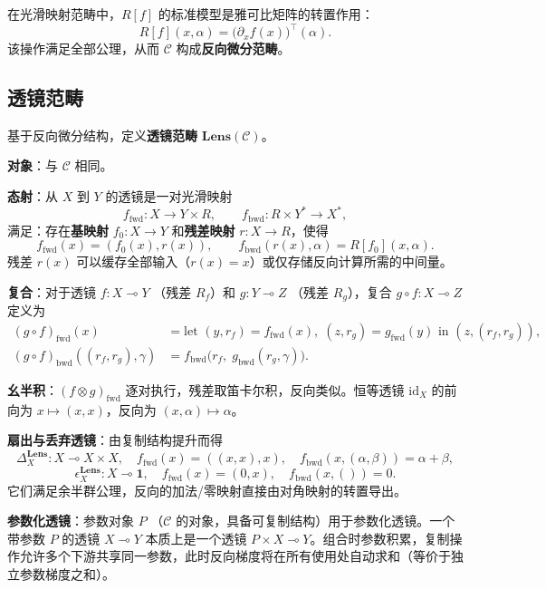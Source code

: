 \documentclass{ctexart}
\newcommand{\lensarrow}{\multimap}
\begin{document}
在光滑映射范畴中，$R[f]$ 的标准模型是雅可比矩阵的转置作用：
\[
R[f](x, \alpha) = \big( \partial_x f(x) \big)^\top (\alpha).
\]
该操作满足全部公理，从而 $\mathcal{C}$ 构成\textbf{反向微分范畴}。

\subsection{透镜范畴}

基于反向微分结构，定义\textbf{透镜范畴} $\mathbf{Lens}(\mathcal{C})$。

\textbf{对象}：与 $\mathcal{C}$ 相同。

\textbf{态射}：从 $X$ 到 $Y$ 的透镜是一对光滑映射
\[
f_{\mathrm{fwd}} : X \to Y \times R, \qquad
f_{\mathrm{bwd}} : R \times Y^* \to X^*,
\]
满足：存在\textbf{基映射} $f_0: X \to Y$ 和\textbf{残差映射} $r: X \to R$，使得
\[
f_{\mathrm{fwd}}(x) = (f_0(x), r(x)), \qquad
f_{\mathrm{bwd}}(r(x), \alpha) = R[f_0](x, \alpha).
\]
残差 $r(x)$ 可以缓存全部输入（$r(x)=x$）或仅存储反向计算所需的中间量。

\textbf{复合}：对于透镜 $f: X \lensarrow Y$ （残差 $R_f$）和 $g: Y \lensarrow Z$ （残差 $R_g$），复合 $g \circ f: X \lensarrow Z$ 定义为
\[
\begin{aligned}
(g \circ f)_{\mathrm{fwd}}(x) &= \text{let } (y, r_f) = f_{\mathrm{fwd}}(x),\; (z, r_g) = g_{\mathrm{fwd}}(y) \text{ in } (z, (r_f, r_g)),\\
(g \circ f)_{\mathrm{bwd}}((r_f, r_g), \gamma) &= f_{\mathrm{bwd}}\big(r_f,\; g_{\mathrm{bwd}}(r_g, \gamma)\big).
\end{aligned}
\]

\textbf{幺半积}：$(f \otimes g)_{\mathrm{fwd}}$ 逐对执行，残差取笛卡尔积，反向类似。恒等透镜 $\mathrm{id}_X$ 的前向为 $x \mapsto (x, x)$，反向为 $(x, \alpha)\mapsto \alpha$。

\textbf{扇出与丢弃透镜}：由复制结构提升而得
\[
\Delta_X^{\mathbf{Lens}} : X \lensarrow X \times X, \quad
f_{\mathrm{fwd}}(x) = ((x,x), x), \quad f_{\mathrm{bwd}}(x, (\alpha,\beta)) = \alpha + \beta,
\]
\[
\epsilon_X^{\mathbf{Lens}} : X \lensarrow \mathbf{1}, \quad
f_{\mathrm{fwd}}(x) = (0, x), \quad f_{\mathrm{bwd}}(x, ()) = 0 .
\]
它们满足余半群公理，反向的加法/零映射直接由对角映射的转置导出。

\textbf{参数化透镜}：参数对象 $P$ （$\mathcal{C}$ 的对象，具备可复制结构）用于参数化透镜。一个带参数 $P$ 的透镜 $X \lensarrow Y$ 本质上是一个透镜 $P \times X \lensarrow Y$。组合时参数积累，复制操作允许多个下游共享同一参数，此时反向梯度将在所有使用处自动求和（等价于独立参数梯度之和）。
\end{document}
